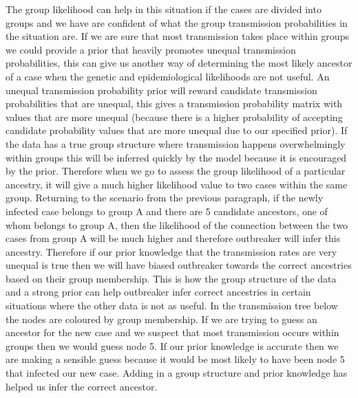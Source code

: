 \documentclass[11pt,a4paper]{report}
\begin{document}
The group likelihood can help in this situation if the cases are divided into groups and we have are confident of what the group transmission probabilities in the situation are. If we are sure that most transmission takes place within groups we could provide a prior that heavily promotes unequal transmission probabilities, this can give us another way of determining the most likely ancestor of a case when the genetic and epidemiological likelihoods are not useful.  An unequal transmission probability prior will reward candidate transmission probabilities that are unequal, this gives a transmission probability matrix with values that are more unequal (because there is a higher probability of accepting candidate probability values that are more unequal due to our specified prior). If the data has a true group structure where transmission happens overwhelmingly within groups this will be inferred quickly by the model because it is encouraged by the prior. Therefore when we go to assess the group likelihood of a particular ancestry, it will give a much higher likelihood value to two cases within the same group. Returning to the scenario from the previous paragraph, if the newly infected case belongs to group A and there are 5 candidate ancestors, one of whom belongs to group A, then the likelihood of the connection between the two cases from group A will be much higher and therefore outbreaker will infer this ancestry. Therefore if our prior knowledge that the transmission rates are very unequal is true then we will have biased outbreaker towards the correct ancestries based on their group membership. This is how the group structure of the data and a strong prior can help outbreaker infer correct ancestries in certain situations where the other data is not as useful. In the transmission tree below the nodes are coloured by group membership. If we are trying to guess an ancestor for the new case and we suspect that most transmission occurs within groups then we would guess node 5. If our prior knowledge is accurate then we are making a sensible guess because it would be most likely to have been node 5 that infected our new case. Adding in a group structure and prior knowledge has helped us infer the correct ancestor.
\end{document}
